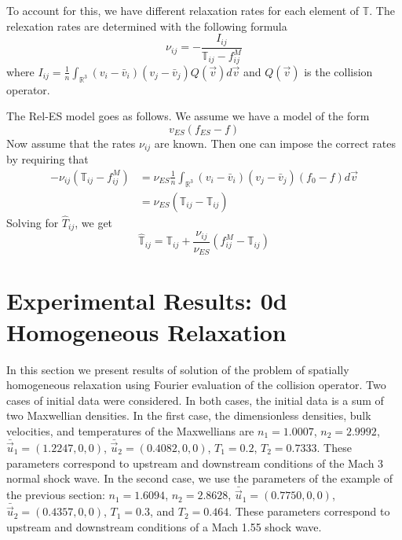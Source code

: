 \documentclass[12pt]{CSUNthesis}
\def\T{\mathbb{T}}
\def\R{\mathbb{R}}
\def\T{\mathbb{T}}
\def\R{\mathbb{R}}
\newcommand{\vecv}{\vec{v}}
\begin{document}
To account for this, we have different relaxation rates for each element of $\T$. The relexation rates are determined with the following formula
\begin{equation}
\nu_{ij} = -\frac{I_{ij}}{\T_{ij}-f_{ij}^M}
\end{equation}
where $I_{ij} = \frac{1}{n}\int_{\R^3} (v_i-\bar{v}_i)(v_j-\bar{v}_j)Q(\vecv)d\vec{v}$ and $Q(\vecv)$ is the collision operator.


The Rel-ES model goes as follows. We assume we have a model of the form
\begin{equation}
\label{eq:reles_model}
v_{ES}(f_{ES} - f)
\end{equation}
Now assume that the rates $\nu_{ij}$ are known. Then one can impose the correct rates by requiring that
\begin{align*}
-\nu_{ij}(\T_{ij} - f^M_{ij}) &= \nu_{ES} \frac{1}{n}\int_{\R^3} (v_i - \bar{v}_i)(v_j-\bar{v}_j)(f_0 - f) d\vecv \\
&= \nu_{ES}(\hat{{\T}}_{ij}-\T_{ij})
\end{align*}
Solving for $\hat{T}_{ij}$, we get
\begin{equation*}
\hat{\T}_{ij}=\T_{ij} + \frac{\nu_{ij}}{\nu_{ES}}(f^M_{ij}-\T_{ij})
\end{equation*}



\section{Experimental Results: 0d Homogeneous Relaxation}

In this section we present results of solution of the problem of 
spatially homogeneous relaxation using Fourier evaluation of the 
collision operator. Two cases of initial data were considered. In 
both cases, the initial data is a sum of two Maxwellian densities. 
In the first case, the 
dimensionless densities, bulk velocities, and temperatures of the 
Maxwellians are $n_1=1.0007$, $n_2=2.9992$, 
$\bar{\vec{u}}_{1}=(1.2247,0,0)$, $\bar{\vec{u}}_{2}=(0.4082,0,0)$,
$T_{1}=0.2$, $T_{2}=0.7333$. These parameters correspond to upstream 
and downstream conditions of the Mach 3 normal shock wave.  
In the second case, we use the parameters of the example of the previous  
section: $n_{1}=1.6094$, $n_{2}=2.8628$, $\bar{\vec{u}}_{1}=(0.7750,0,0)$, $\bar{\vec{u}}_{2}=(0.4357,0,0)$, $T_{1}=0.3$, and $T_{2}=0.464$. These 
parameters correspond to upstream and downstream conditions of a Mach 1.55 
shock wave. 
\end{document}
